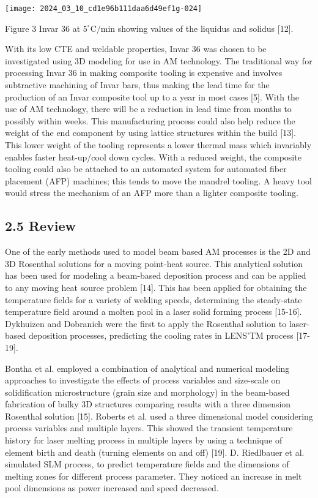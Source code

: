 \documentclass[10pt]{article}
\begin{document}
\begin{center}
\texttt{[image: 2024\_03\_10\_cd1e96b111daa6d49ef1g-024]}
\end{center}

Figure 3 Invar 36 at $5^{\circ} \mathrm{C} / \mathrm{min}$ showing values of the liquidus and solidus [12].

With its low CTE and weldable properties, Invar 36 was chosen to be investigated using 3D modeling for use in AM technology. The traditional way for processing Invar 36 in making composite tooling is expensive and involves subtractive machining of Invar bars, thus making the lead time for the production of an Invar composite tool up to a year in most cases [5]. With the use of AM technology, there will be a reduction in lead time from months to possibly within weeks. This manufacturing process could also help reduce the weight of the end component by using lattice structures within the build [13]. This lower weight of the tooling represents a lower thermal mass which invariably enables faster heat-up/cool down cycles. With a reduced weight, the composite tooling could also be attached to an automated system for automated fiber placement (AFP) machines; this tends to move the mandrel tooling. A heavy tool would stress the mechanism of an AFP more than a lighter composite tooling.

\subsection*{2.5 Review}
One of the early methods used to model beam based AM processes is the 2D and 3D Rosenthal solutions for a moving point-heat source. This analytical solution has been used for modeling a beam-based deposition process and can be applied to any moving heat source problem [14]. This has been applied for obtaining the temperature fields for a variety of welding speeds, determining the steady-state temperature field around a molten pool in a laser solid forming process [15-16]. Dykhuizen and Dobranich were the first to apply the Rosenthal solution to laser-based deposition processes, predicting the cooling rates in LENS'TM process [17-19].

Bontha et al. employed a combination of analytical and numerical modeling approaches to investigate the effects of process variables and size-scale on solidification microstructure (grain size and morphology) in the beam-based fabrication of bulky 3D structures comparing results with a three dimension Rosenthal solution [15]. Roberts et al. used a three dimensional model considering process variables and multiple layers. This showed the transient temperature history for laser melting process in multiple layers by using a technique of element birth and death (turning elements on and off) [19]. D. Riedlbauer et al. simulated SLM process, to predict temperature fields and the dimensions of melting zones for different process parameter. They noticed an increase in melt pool dimensions as power increased and speed decreased.
\end{document}
